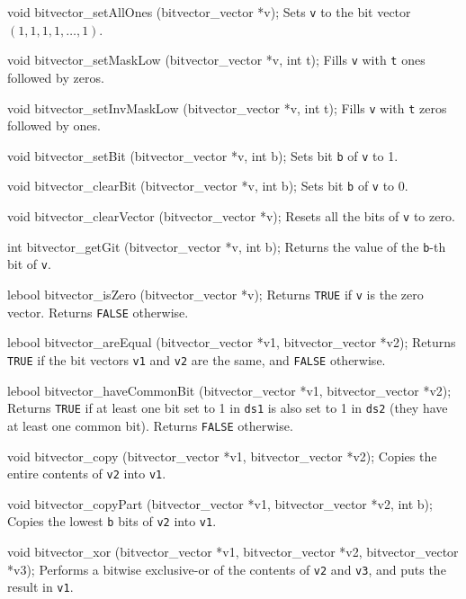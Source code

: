 void bitvector_setAllOnes (bitvector_vector *v);
\endcode
 \tab
Sets {\tt v} to the bit vector $(1, 1, 1, 1,\dots , 1)$.
 \endtab
\code

void bitvector_setMaskLow (bitvector_vector *v, int t);
\endcode
 \tab
Fills {\tt v} with {\tt t} ones followed by zeros.
 \endtab
\code

void bitvector_setInvMaskLow (bitvector_vector *v, int t);
\endcode
 \tab
Fills {\tt v} with {\tt t} zeros followed by ones.
 \endtab
\code

void bitvector_setBit (bitvector_vector *v, int b);           
\endcode
 \tab
Sets bit {\tt b} of {\tt v} to 1.
\endtab
\code

void bitvector_clearBit (bitvector_vector *v, int b);           
\endcode
 \tab
Sets bit {\tt b} of {\tt v} to 0.
\endtab
\code

void bitvector_clearVector (bitvector_vector *v);
\endcode                                
 \tab
Resets all the bits of {\tt v} to zero.
 \endtab
\code

int bitvector_getGit (bitvector_vector *v, int b);                     
\endcode
 \tab
Returns the value of the {\tt b}-th bit of {\tt v}.
\endtab
\code

lebool bitvector_isZero (bitvector_vector *v);
\endcode
 \tab
Returns {\tt TRUE} if {\tt v} is the zero vector.  Returns {\tt FALSE} otherwise.
\endtab
\code

lebool bitvector_areEqual (bitvector_vector *v1, bitvector_vector *v2); 
\endcode
\tab
Returns {\tt TRUE} if the bit vectors {\tt v1} and {\tt v2} are the same, 
and {\tt FALSE} otherwise.
\endtab
\code

lebool bitvector_haveCommonBit (bitvector_vector *v1, bitvector_vector *v2);
\endcode
 \tab
Returns {\tt TRUE} if at least one bit set to 1 in {\tt ds1} is also set to 1 in {\tt ds2}
(they have at least one common bit).  Returns {\tt FALSE} otherwise.
 \endtab
\code

void bitvector_copy (bitvector_vector *v1, bitvector_vector *v2);
  \endcode
 \tab
Copies the entire contents of {\tt v2} into {\tt v1}. 
 \endtab
\code 

void bitvector_copyPart (bitvector_vector *v1, bitvector_vector *v2, int b);
\endcode
 \tab
Copies the lowest {\tt b} bits of {\tt v2} into {\tt v1}.
 \endtab
\code

void bitvector_xor (bitvector_vector *v1, bitvector_vector *v2, bitvector_vector *v3);
\endcode
 \tab
Performs a bitwise exclusive-or of the contents of \texttt{v2} and \texttt{v3},
and puts the result in \texttt{v1}.
\endtab
\code

